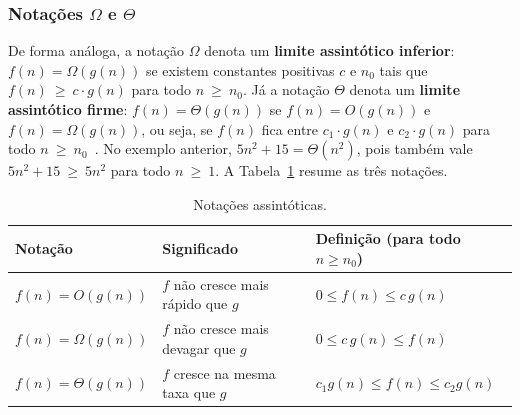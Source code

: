 \documentclass[11pt,fleqn]{book} %
\begin{document}
\subsubsection{Notações $\Omega$ e $\Theta$}
De forma análoga, a notação $\Omega$ denota um \textbf{limite assintótico inferior}: $f(n) = \Omega(g(n))$ se existem constantes positivas $c$ e $n_0$ tais que $f(n)~\geq~c \cdot g(n)$ para todo $n~\geq~n_0$.
Já a notação $\Theta$ denota um \textbf{limite assintótico firme}: $f(n) = \Theta(g(n))$ se $f(n) = O(g(n))$ e $f(n) = \Omega(g(n))$, ou seja, se $f(n)$ fica entre $c_1 \cdot g(n)$ e $c_2 \cdot g(n)$ para todo $n~\geq~n_0$~\cite{knuth1976,cormen2009}.
No exemplo anterior, $5n^2 + 15 = \Theta(n^2)$, pois também vale $5n^2 + 15~\geq~5n^2$ para todo $n~\geq~1$.
A Tabela~\ref{tab:notacoes} resume as três notações.

\begin{table}[htbp]
\centering
\caption{Notações assintóticas.}
\label{tab:notacoes}
\begin{tabular}{@{}lll@{}}
\toprule
Notação & Significado & Definição (para todo $n \geq n_0$) \\ \midrule
$f(n) = O(g(n))$ & $f$ não cresce mais rápido que $g$ & $0 \leq f(n) \leq c\,g(n)$ \\
$f(n) = \Omega(g(n))$ & $f$ não cresce mais devagar que $g$ & $0 \leq c\,g(n) \leq f(n)$ \\
$f(n) = \Theta(g(n))$ & $f$ cresce na mesma taxa que $g$ & $c_1 g(n) \leq f(n) \leq c_2 g(n)$ \\ \bottomrule
\end{tabular}
\end{table}
\end{document}
